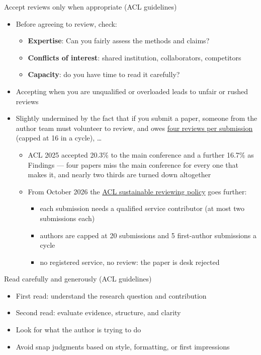 \documentclass[aspectratio=169]{beamer}
\begin{document}
\begin{frame}{Accept reviews only when appropriate (ACL guidelines)}
\begin{itemize}
  \item Before agreeing to review, check:
    \begin{itemize}
      \item \textbf{Expertise}: Can you fairly assess the methods and claims?
      \item \textbf{Conflicts of interest}: shared institution, collaborators, competitors
      \item \textbf{Capacity}: do you have time to read it carefully?
    \end{itemize}
  \item Accepting when you are unqualified or overloaded leads to unfair or rushed reviews
  \item Slightly undermined by the fact that if you submit a paper, someone from the author team must volunteer to review, and owes
        \href{https://aclrollingreview.org/reviewing-workload-adjustment/}{four reviews per submission} (capped at 16 in a cycle), \ldots
      \begin{itemize}
    \item ACL 2025 accepted 20.3\% to the main conference and a further 16.7\% as Findings --- four papers miss the main conference for every one that makes it, and nearly two thirds are turned down altogether
    \item From October 2026 the \href{https://aclrollingreview.org/sustainable-reviewing-2026}{ACL sustainable reviewing policy} goes further:
      \begin{itemize}
      \item each submission needs a qualified service contributor (at most two submissions each)
      \item authors are capped at 20 submissions and 5 first-author submissions a cycle
      \item no registered service, no review: the paper is desk rejected
      \end{itemize}
    \end{itemize}
\end{itemize}

\end{frame}


\begin{frame}{Read carefully and generously (ACL guidelines)}
\begin{itemize}
  \item First read: understand the research question and contribution
  \item Second read: evaluate evidence, structure, and clarity
  \item Look for what the author is trying to do
  \item Avoid snap judgments based on style, formatting, or first impressions
\end{itemize}

\end{frame}
\end{document}
